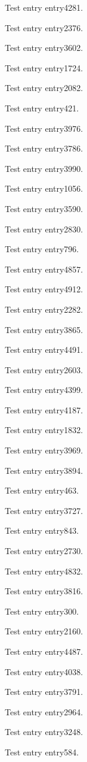 Test entry \gls{entry4281}.

Test entry \gls{entry2376}.

Test entry \gls{entry3602}.

Test entry \gls{entry1724}.

Test entry \gls{entry2082}.

Test entry \gls{entry421}.

Test entry \gls{entry3976}.

Test entry \gls{entry3786}.

Test entry \gls{entry3990}.

Test entry \gls{entry1056}.

Test entry \gls{entry3590}.

Test entry \gls{entry2830}.

Test entry \gls{entry796}.

Test entry \gls{entry4857}.

Test entry \gls{entry4912}.

Test entry \gls{entry2282}.

Test entry \gls{entry3865}.

Test entry \gls{entry4491}.

Test entry \gls{entry2603}.

Test entry \gls{entry4399}.

Test entry \gls{entry4187}.

Test entry \gls{entry1832}.

Test entry \gls{entry3969}.

Test entry \gls{entry3894}.

Test entry \gls{entry463}.

Test entry \gls{entry3727}.

Test entry \gls{entry843}.

Test entry \gls{entry2730}.

Test entry \gls{entry4832}.

Test entry \gls{entry3816}.

Test entry \gls{entry300}.

Test entry \gls{entry2160}.

Test entry \gls{entry4487}.

Test entry \gls{entry4038}.

Test entry \gls{entry3791}.

Test entry \gls{entry2964}.

Test entry \gls{entry3248}.

Test entry \gls{entry584}.

